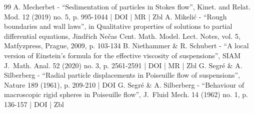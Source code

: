 \begin{thebibliography}{99}
A. Mecherbet - “Sedimentation of particles in Stokes flow”, Kinet. and Relat. Mod. 12 (2019) no. 5, p. 995-1044 | DOI | MR | Zbl
A. Mikelić - “Rough boundaries and wall laws”, in Qualitative properties of solutions to partial differential equations, Jindřich Nečas Cent. Math. Model. Lect. Notes, vol. 5, Matfyzpress, Prague, 2009, p. 103-134
B. Niethammer \& R. Schubert - “A local version of Einstein’s formula for the effective viscosity of suspensions”, SIAM J. Math. Anal. 52 (2020) no. 3, p. 2561-2591 | DOI | MR | Zbl
G. Segré \& A. Silberberg - “Radial particle displacements in Poiseuille flow of suspensions”, Nature 189 (1961), p. 209-210 | DOI
G. Segré \& A. Silberberg - “Behaviour of macroscopic rigid spheres in Poiseuille flow”, J. Fluid Mech. 14 (1962) no. 1, p. 136-157 | DOI | Zbl
\end{thebibliography}

